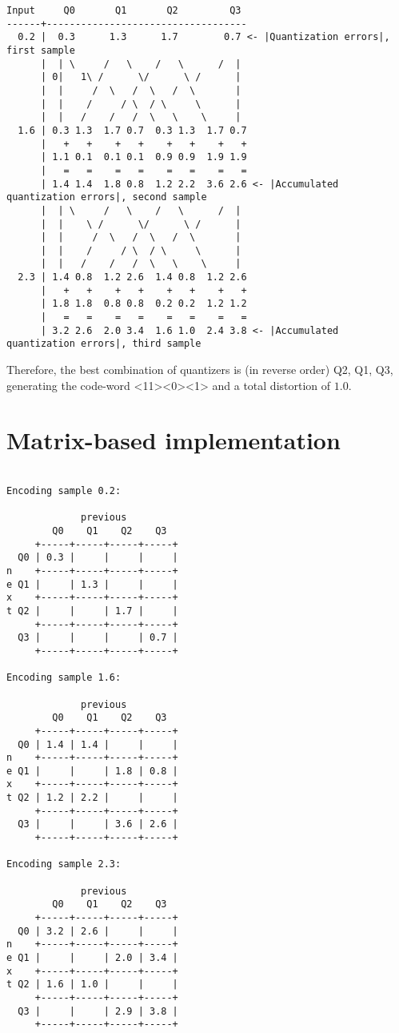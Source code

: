 \begin{verbatim}
Input     Q0       Q1       Q2         Q3
------+-----------------------------------
  0.2 |  0.3      1.3      1.7        0.7 <- |Quantization errors|, first sample
      |  | \     /   \    /   \      /  |
      | 0|   1\ /      \/      \ /      |
      |  |     /  \   /  \   /  \       | 
      |  |    /     / \  / \     \      |
      |  |   /    /   /  \   \    \     |
  1.6 | 0.3 1.3  1.7 0.7  0.3 1.3  1.7 0.7
      |   +   +    +   +    +   +    +   +
      | 1.1 0.1  0.1 0.1  0.9 0.9  1.9 1.9
      |   =   =    =   =    =   =    =   =
      | 1.4 1.4  1.8 0.8  1.2 2.2  3.6 2.6 <- |Accumulated quantization errors|, second sample
      |  | \     /   \    /   \      /  |
      |  |    \ /      \/      \ /      |
      |  |     /  \   /  \   /  \       | 
      |  |    /     / \  / \     \      |
      |  |   /    /   /  \   \    \     |
  2.3 | 1.4 0.8  1.2 2.6  1.4 0.8  1.2 2.6 
      |   +   +    +   +    +   +    +   +
      | 1.8 1.8  0.8 0.8  0.2 0.2  1.2 1.2
      |   =   =    =   =    =   =    =   =
      | 3.2 2.6  2.0 3.4  1.6 1.0  2.4 3.8 <- |Accumulated quantization errors|, third sample
\end{verbatim}

Therefore, the best combination of quantizers is (in reverse order)
Q2, Q1, Q3, generating the code-word <11><0><1> and a total distortion
of $1.0$.

\section{Matrix-based implementation}

\begin{verbatim}

Encoding sample 0.2:

             previous
        Q0    Q1    Q2    Q3
     +-----+-----+-----+-----+
  Q0 | 0.3 |     |     |     |
n    +-----+-----+-----+-----+
e Q1 |     | 1.3 |     |     |
x    +-----+-----+-----+-----+
t Q2 |     |     | 1.7 |     |
     +-----+-----+-----+-----+
  Q3 |     |     |     | 0.7 |
     +-----+-----+-----+-----+

Encoding sample 1.6:

             previous
        Q0    Q1    Q2    Q3
     +-----+-----+-----+-----+
  Q0 | 1.4 | 1.4 |     |     |
n    +-----+-----+-----+-----+
e Q1 |     |     | 1.8 | 0.8 |
x    +-----+-----+-----+-----+
t Q2 | 1.2 | 2.2 |     |     |
     +-----+-----+-----+-----+
  Q3 |     |     | 3.6 | 2.6 |
     +-----+-----+-----+-----+

Encoding sample 2.3:

             previous
        Q0    Q1    Q2    Q3
     +-----+-----+-----+-----+
  Q0 | 3.2 | 2.6 |     |     |
n    +-----+-----+-----+-----+
e Q1 |     |     | 2.0 | 3.4 |
x    +-----+-----+-----+-----+
t Q2 | 1.6 | 1.0 |     |     |
     +-----+-----+-----+-----+
  Q3 |     |     | 2.9 | 3.8 |
     +-----+-----+-----+-----+
\end{verbatim}

